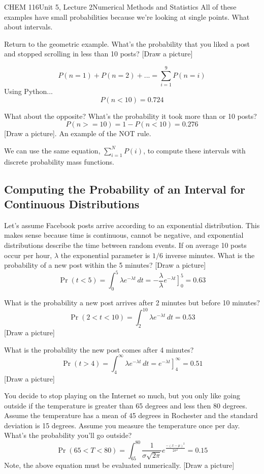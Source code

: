 \documentclass{article}
\begin{document}
\begin{tdoc}{CHEM 116}{Unit 5, Lecture 2}{Numerical Methods and Statistics}
 All of these examples have small probabilities because we're looking
 at single points. What about intervals.

Return to the geometric example. What's the probability that you liked
a post and stopped scrolling in less than 10 posts? [Draw a picture]

\[
P(n = 1) + P(n = 2) + ... = \sum_{i=1}^{9} P(n = i)
\]
Using Python...
\[
P(n < 10) = 0.724
\]

What about the opposite? What's the probability it took more than or
10 posts?
\[
P(n >= 10) = 1 - P(n < 10) = 0.276
\]
[Draw a picture]. An example of the NOT rule.

We can use the same equation, $\sum_{i=1}^N P(i)$, to compute these
intervals with discrete probability mass functions.

\subsection{Computing the Probability of an Interval for Continuous Distributions}

Let's assume Facebook posts arrive according to an exponential
distribution. This makes sense because time is continuous, cannot be
negative, and exponential distributions describe the time between
random events. If on average 10 posts occur per hour, $\lambda$ the
exponential parameter is $1/6$ inverse minutes. What is the probability of a
new post within the 5 minutes? [Draw a picture]
\[
\Pr(t < 5) = \int_0^{5} \lambda e^{-\lambda t}\,dt = -\frac{\lambda}{\lambda}\left.e^{-\lambda t}\right]_0^{5} = 0.63
\]

What is the probability a new post arrives after 2 minutes but before 10 minutes?
\[
\Pr(2 < t < 10) = \int_{2}^{10} \lambda e^{-\lambda t}\,dt  = 0.53
\]
[Draw a picture]

What is the probability the new post comes after 4 minutes?
\[
\Pr(t > 4) = \int_4^{\infty}  \lambda e^{-\lambda t}\,dt = \left.e^{-\lambda t}\right]_4^{\infty} = 0.51
\]
[Draw a picture]

You decide to stop playing on the Internet so much, but you only like
going outside if the temperature is greater than 65 degrees and less
then 80 degrees. Assume the temperature has a mean of 45 degrees in
Rochester and the standard deviation is 15 degrees. Assume you measure
the temperature once per day. What's the probability you'll go outside?
\[
\Pr(65 < T < 80) = \int_{65}^{80} \frac{1}{\sigma\sqrt{2\pi}}e^{\frac{-(x - \mu)^2}{2\sigma ^2}} = 0.15
\]
Note, the above equation must be evaluated numerically. [Draw a
  picture]


\end{tdoc}
\end{document}
